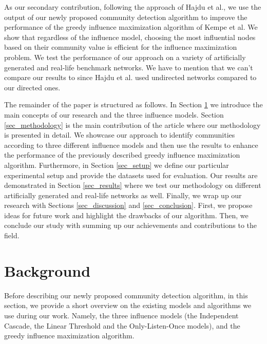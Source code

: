\documentclass[pdflatex,sn-mathphys-num]{sn-jnl}
\begin{document}
As our secondary contribution, following the approach of Hajdu et al., we use the output of our newly proposed community detection algorithm to improve the performance of the greedy influence maximization algorithm of Kempe et al. We show that regardless of the influence model, choosing the most influential nodes based on their community value is efficient for the influence maximization problem. We test the performance of our approach on a variety of artificially generated and real-life benchmark networks. We have to mention that we can't compare our results to \cite{evaluating} since Hajdu et al. used undirected networks compared to our directed ones.

The remainder of the paper is structured as follows. In Section \ref{sec_background} we introduce the main concepts of our research and the three influence models. Section \ref{sec_methodology} is the main contribution of the article where our methodology is presented in detail. We showcase our approach to identify communities according to three different influence models and then use the results to enhance the performance of the previously described greedy influence maximization algorithm. Furthermore, in Section \ref{sec_setup} we define our particular experimental setup and provide the datasets used for evaluation. Our results are demonstrated in Section \ref{sec_results} where we test our methodology on different artificially generated and real-life networks as well. Finally, we wrap up our research with Sections \ref{sec_discussion} and \ref{sec_conclusion}. First, we propose ideas for future work and highlight the drawbacks of our algorithm. Then, we conclude our study with summing up our achievements and contributions to the field.


\section{Background}\label{sec_background}

Before describing our newly proposed community detection algorithm, in this section, we provide a short overview on the existing models and algorithms we use during our work. Namely, the three influence models (the Independent Cascade, the Linear Threshold and the Only-Listen-Once models), and the greedy influence maximization algorithm.


\end{document}
